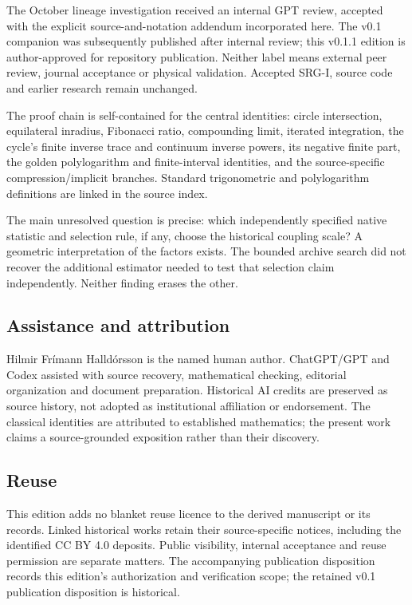 \documentclass[11pt,a4paper]{article}
\begin{document}
The October lineage investigation received an internal GPT review, accepted with the explicit source-and-notation addendum incorporated here. The v0.1 companion was subsequently published after internal review; this v0.1.1 edition is author-approved for repository publication. Neither label means external peer review, journal acceptance or physical validation. Accepted SRG-I, source code and earlier research remain unchanged.


The proof chain is self-contained for the central identities: circle intersection, equilateral inradius, Fibonacci ratio, compounding limit, iterated integration, the cycle's finite inverse trace and continuum inverse powers, its negative finite part, the golden polylogarithm and finite-interval identities, and the source-specific compression/implicit branches. Standard trigonometric and polylogarithm definitions are linked in the source index.


The main unresolved question is precise: which independently specified native statistic and selection rule, if any, choose the historical coupling scale? A geometric interpretation of the factors exists. The bounded archive search did not recover the additional estimator needed to test that selection claim independently. Neither finding erases the other.


\subsection*{Assistance and attribution}

Hilmir Frímann Halldórsson is the named human author. ChatGPT/GPT and Codex assisted with source recovery, mathematical checking, editorial organization and document preparation. Historical AI credits are preserved as source history, not adopted as institutional affiliation or endorsement. The classical identities are attributed to established mathematics; the present work claims a source-grounded exposition rather than their discovery.


\subsection*{Reuse}

This edition adds no blanket reuse licence to the derived manuscript or its records. Linked historical works retain their source-specific notices, including the identified CC BY 4.0 deposits. Public visibility, internal acceptance and reuse permission are separate matters. The accompanying publication disposition records this edition's authorization and verification scope; the retained v0.1 publication disposition is historical.
\end{document}
